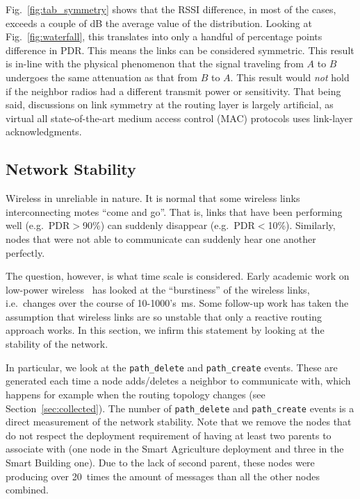 \documentclass{elsarticle}
\newcommand{\building}            {Smart Building\xspace}
\newcommand{\agri}                {Smart Agriculture\xspace}
\newcommand{\pathcreate}          {{\tt path\_create}\xspace}
\newcommand{\pathdelete}          {{\tt path\_delete}\xspace}
\begin{document}
Fig.~\ref{fig:tab_symmetry} shows that the RSSI difference, in most of the cases, exceeds a couple of dB the average value of the distribution.
Looking at Fig.~\ref{fig:waterfall}, this translates into only a handful of percentage points difference in PDR.
This means the links can be considered symmetric.
This result is in-line with the physical phenomenon that the signal traveling from $A$ to $B$ undergoes the same attenuation as that from $B$ to $A$.
This result would \textit{not} hold if the neighbor radios had a different transmit power or sensitivity.
That being said, discussions on link symmetry at the routing layer is largely artificial, as virtual all state-of-the-art medium access control (MAC) protocols uses link-layer acknowledgments.

\subsection{Network Stability}
\label{sec:net_stability}


Wireless in unreliable in nature.
It is normal that some wireless links interconnecting motes ``come and go''.
That is, links that have been performing well (e.g.~PDR$>$90\%) can suddenly disappear (e.g.~PDR$<$10\%).
Similarly, nodes that were not able to communicate can suddenly hear one another perfectly.


The question, however, is what time scale is considered.
Early academic work on low-power wireless~\cite{srinivasan08beta} has looked at the ``burstiness'' of the wireless links, i.e.~changes over the course of 10-1000's~ms.
Some follow-up work has taken the assumption that wireless links are so unstable that only a reactive routing approach works.
In this section, we infirm this statement by looking at the stability of the network.


In particular, we look at the \pathdelete and \pathcreate events.
These are generated each time a node adds/deletes a neighbor to communicate with, which happens for example when the routing topology changes (see Section~\ref{sec:collected}).
The number of \pathdelete and \pathcreate events is a direct measurement of the network stability.
Note that we remove the nodes that do not respect the deployment requirement of having at least two parents to associate with (one node in the \agri deployment and three in the \building one).
Due to the lack of second parent, these nodes were producing over 20~times the amount of messages than all the other nodes combined.
\end{document}
